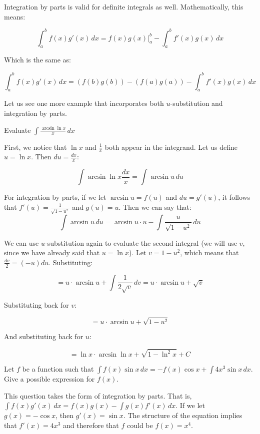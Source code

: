 Integration by parts is valid for definite integrals as well. Mathematically, 
this means:

$$\int_a^b f(x)g'(x)\,dx = f(x)g(x)|_a^b - \int_a^b f'(x)g(x)\,dx$$

Which is the same as:

$$\int_a^b f(x)g'(x)\,dx = \left( f(b) g(b) \right) - \left( f(a) g(a) \right) 
- \int_a^b f'(x)g(x)\,dx$$

Let us see one more example that incorporates both $u$-substitution and 
integration by parts.

\begin{Worked}
\begin{Problem}
Evaluate $\int \frac{\arcsin{\ln{x}}}{x}\,dx$
\end{Problem}
\begin{Solution}
First, we notice that $\ln{x}$ and $\frac{1}{x}$ both 
appear in the integrand. Let us define $u = \ln{x}$. Then $du = \frac{dx}{x}$:

$$\int \arcsin{\ln{x}} \frac{dx}{x} = \int \arcsin{u}\,du$$

For integration by parts, if we let $\arcsin{u} = f(u)$ and $du = g'(u)$, it 
follows that $f'(u) = \frac{1}{\sqrt{1-u^2}}$ and $g(u) = u$. Then we can say 
that:
$$\int \arcsin{u}\,du = \arcsin{u} \cdot u - \int \frac{u}{\sqrt{1-u^2}}\,du$$

We can use $u$-substitution again to evaluate the second integral (we will use 
$v$, since we have already said that $u = \ln{x}$). Let $v = 1-u^2$, which 
means that $\frac{dv}{2} = (-u)du$. Substituting:

$$= u \cdot \arcsin{u} + \int \frac{1}{2\sqrt{v}}\,dv = u \cdot \arcsin{u} + 
\sqrt{v}$$

Substituting back for $v$:

$$= u \cdot \arcsin{u} + \sqrt{1-u^2}$$

And substituting back for $u$:

$$= \ln{x} \cdot \arcsin{\ln{x}} + \sqrt{1 - \ln^2{x}} + C$$
\end{Solution}
\end{Worked}

\begin{Exercise}[label=int_meth3]
Let $f$ be a function such that $\int f(x) \sin{x}\,dx = -f(x)\cos{x} 
+ \int 4x^3 \sin{x}\,dx$. Give a possible expression for $f(x)$. 
\end{Exercise}

\begin{Answer}[ref=int_meth3]
This question takes the form of integration by parts. That is, $\int 
f(x)g'(x)\,dx = f(x)g(x) - \int g(x)f'(x)\,dx$. If we let $g(x) = 
-\cos{x}$, then $g'(x) =\sin{x}$. The structure of the equation 
implies that $f'(x) = 4x^3$ and therefore that $f$ could be $f(x) = 
x^4$. 
\end{Answer}

